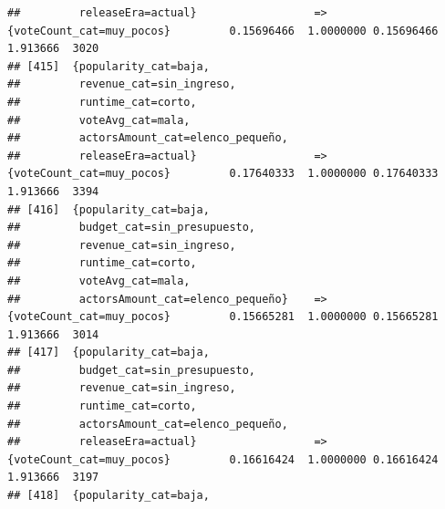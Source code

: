 \documentclass[
]{article}
\begin{document}
\begin{verbatim}
##         releaseEra=actual}                  => {voteCount_cat=muy_pocos}         0.15696466  1.0000000 0.15696466 1.913666  3020
## [415]  {popularity_cat=baja,                                                                                                    
##         revenue_cat=sin_ingreso,                                                                                                
##         runtime_cat=corto,                                                                                                      
##         voteAvg_cat=mala,                                                                                                       
##         actorsAmount_cat=elenco_pequeño,                                                                                        
##         releaseEra=actual}                  => {voteCount_cat=muy_pocos}         0.17640333  1.0000000 0.17640333 1.913666  3394
## [416]  {popularity_cat=baja,                                                                                                    
##         budget_cat=sin_presupuesto,                                                                                             
##         revenue_cat=sin_ingreso,                                                                                                
##         runtime_cat=corto,                                                                                                      
##         voteAvg_cat=mala,                                                                                                       
##         actorsAmount_cat=elenco_pequeño}    => {voteCount_cat=muy_pocos}         0.15665281  1.0000000 0.15665281 1.913666  3014
## [417]  {popularity_cat=baja,                                                                                                    
##         budget_cat=sin_presupuesto,                                                                                             
##         revenue_cat=sin_ingreso,                                                                                                
##         runtime_cat=corto,                                                                                                      
##         actorsAmount_cat=elenco_pequeño,                                                                                        
##         releaseEra=actual}                  => {voteCount_cat=muy_pocos}         0.16616424  1.0000000 0.16616424 1.913666  3197
## [418]  {popularity_cat=baja,                                                                                                    

\end{verbatim}
\end{document}
